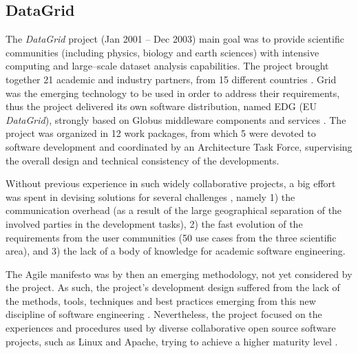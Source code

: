 \subsection{DataGrid}

The {\sl DataGrid} \cite{cordis:datagrid} project (Jan 2001 -- Dec 2003)
main goal was to provide scientific communities (including physics, biology and
earth sciences) with intensive computing and large--scale dataset analysis capabilities.
The project brought together 21 academic and industry partners, from 15 different countries \cite{gagliardi}.
Grid was the emerging technology to be used in order to address their requirements,
thus the project delivered its own software distribution, named EDG (EU {\sl DataGrid}), strongly
based on Globus middleware components and services \cite{globus}. The project was organized in 12 work packages, from
which 5 were devoted to software development and coordinated by an
Architecture Task Force, supervising the overall design and technical consistency
of the developments.

Without previous experience in such widely
collaborative projects, a big effort was spent in devising solutions for several
challenges \cite{datagrid}, namely 1) the communication overhead (as a
result of the large geographical separation of the involved parties in the
development tasks), 2) the fast evolution of the requirements from the user
communities (50 use cases from the three scientific area), and 3) the lack of a body
of knowledge for academic software engineering.

The Agile manifesto \cite{agile-manifesto} was by then an emerging methodology, not yet
considered by the project. As such, the project's
development design suffered from the lack of the methods, tools, techniques and best
practices emerging from this new discipline of software engineering
\cite{agile}. Nevertheless, the project focused on the experiences and procedures
used by diverse collaborative open source software projects, such as Linux and Apache, trying to
achieve a higher maturity level \cite{cmm}.

